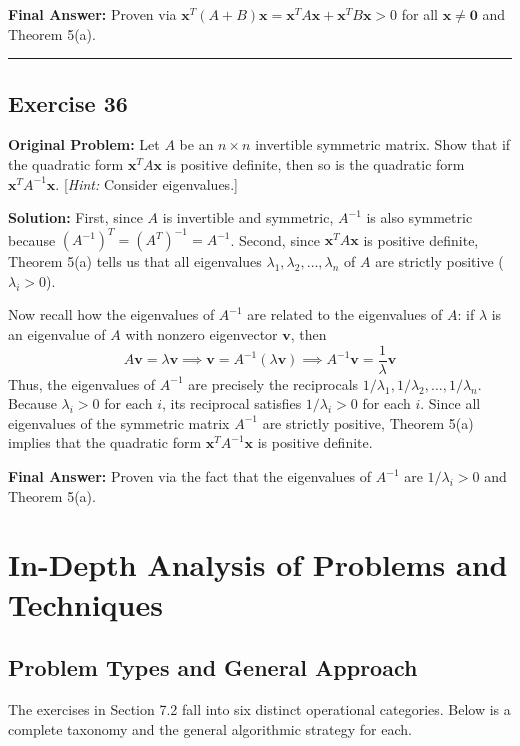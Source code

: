 \documentclass[11pt, letterpaper]{article}
\theoremstyle{definition}
\theoremstyle{remark}
\begin{document}
\textbf{Final Answer:} Proven via $\mathbf{x}^T(A+B)\mathbf{x} = \mathbf{x}^T A\mathbf{x} + \mathbf{x}^T B\mathbf{x} > 0$ for all $\mathbf{x} \neq \mathbf{0}$ and Theorem 5(a).

\medskip\hrule\medskip

\subsection*{Exercise 36}
\textbf{Original Problem:} Let $A$ be an $n \times n$ invertible symmetric matrix. Show that if the quadratic form $\mathbf{x}^T A \mathbf{x}$ is positive definite, then so is the quadratic form $\mathbf{x}^T A^{-1} \mathbf{x}$. [\textit{Hint:} Consider eigenvalues.]

\textbf{Solution:}
First, since $A$ is invertible and symmetric, $A^{-1}$ is also symmetric because $(A^{-1})^T = (A^T)^{-1} = A^{-1}$.
Second, since $\mathbf{x}^T A \mathbf{x}$ is positive definite, Theorem 5(a) tells us that all eigenvalues $\lambda_1, \lambda_2, \dots, \lambda_n$ of $A$ are strictly positive ($\lambda_i > 0$).

Now recall how the eigenvalues of $A^{-1}$ are related to the eigenvalues of $A$: if $\lambda$ is an eigenvalue of $A$ with nonzero eigenvector $\mathbf{v}$, then
\[
A\mathbf{v} = \lambda \mathbf{v} \implies \mathbf{v} = A^{-1}(\lambda \mathbf{v}) \implies A^{-1}\mathbf{v} = \frac{1}{\lambda}\mathbf{v}
\]
Thus, the eigenvalues of $A^{-1}$ are precisely the reciprocals $1/\lambda_1, 1/\lambda_2, \dots, 1/\lambda_n$. Because $\lambda_i > 0$ for each $i$, its reciprocal satisfies $1/\lambda_i > 0$ for each $i$. Since all eigenvalues of the symmetric matrix $A^{-1}$ are strictly positive, Theorem 5(a) implies that the quadratic form $\mathbf{x}^T A^{-1} \mathbf{x}$ is positive definite.

\textbf{Final Answer:} Proven via the fact that the eigenvalues of $A^{-1}$ are $1/\lambda_i > 0$ and Theorem 5(a).

\newpage
\section{In-Depth Analysis of Problems and Techniques}

\subsection{Problem Types and General Approach}
The exercises in Section 7.2 fall into six distinct operational categories. Below is a complete taxonomy and the general algorithmic strategy for each.
\end{document}
